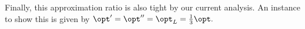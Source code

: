 Finally, this approximation ratio is also tight by our current analysis. An instance to show this is given by $\opt'=\opt''=\opt_L=\frac{1}{3}\opt.$

% 
